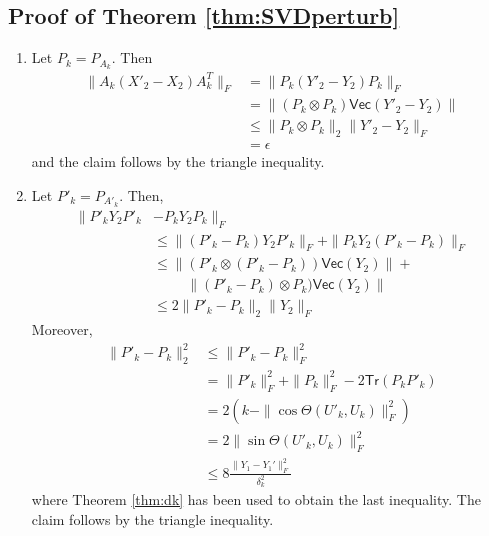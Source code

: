 \documentclass[a4]{article}
\newcommand{\+}[1]{\mathbf{#1}}
\newcommand{\norm}[1]{\|#1\|}
\newcommand{\Tr}{\mathsf{Tr}}
\newcommand{\Vect}{\mathsf{Vec}}
\begin{document}
\subsection{Proof of Theorem \ref{thm:SVDperturb}}
\begin{enumerate}
\item Let $P_{k} = P_{A_{k}}$. Then 
\begin{align*} \norm{A_{k}(X'_{2}- X_{2})A_{k}^{T}}_{F} 
	&= \norm{P_{k}(Y'_{2} - Y_{2})P_{k}}_{F} \\
	&= \norm{(P_{k} \otimes P_{k})\Vect(Y'_{2} - Y_{2})} \\
	&\leq \norm{P_{k} \otimes P_{k}}_{2}\norm{Y'_{2} - Y_{2}}_{F} \\
	&= \epsilon 
\end{align*} and the claim follows by the triangle inequality.
\item Let $P'_{k} = P_{A'_{k}}$. Then,
\begin{align*} \norm{P'_{k}Y_{2}P'_{k} &- P_{k}Y_{2}P_{k}}_{F} \\
	&\leq \norm{(P'_{k} - P_{k})Y_{2}P'_{k}}_{F} + \norm{P_{k}Y_{2}(P'_{k} - P_{k})}_{F} \\
	&\leq \norm{(P'_{k} \otimes (P'_{k} - P_{k}))\Vect(Y_{2})} + \\
                                       & \hspace{1cm}\norm{(P'_{k} - P_{k}) \otimes P_{k})\Vect(Y_{2})} \\
	&\leq 2 \norm{P'_{k} - P_{k}}_{2} \norm{Y_{2}}_{F} 
\end{align*} Moreover, 
\begin{align*} \norm{P'_{k} - P_{k}}_{2}^{2} 
	&\leq \norm{P'_{k} - P_{k}}_{F}^{2} \\
	&= \norm{P'_{k}}_{F}^{2} + \norm{P_{k}}_{F}^{2} - 2\Tr(P_{k}P'_{k}) \\
	&=2(k - \norm{\cos \Theta(U'_{k}, U_{k})}_{F}^{2}) \\
	&=2\norm{\sin \Theta(U'_{k}, U_{k})}_{F}^{2} \\
	&\leq 8 \frac{\norm{Y_{1} - Y_{1}'}^{2}_{F}}{\delta_{k}^{2}} 
\end{align*} where Theorem \ref{thm:dk} has been used to obtain the last inequality. The claim follows by the triangle inequality.
\end{enumerate}
\end{document}
